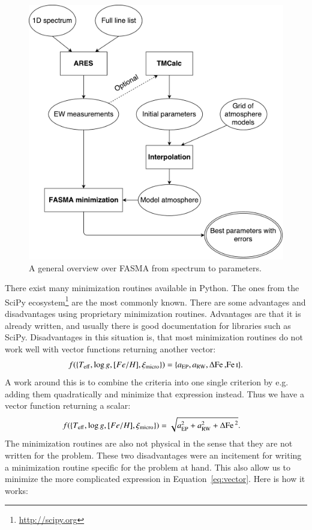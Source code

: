 \documentclass{aa}
\begin{document}
\begin{figure}[tpb]
    \centering
    \includegraphics[width=1.0\linewidth,natwidth=700,natheight=650]{figures/FASMA_general.pdf}
    \caption{A general overview over FASMA from spectrum to parameters.}
    \label{fig:FASMA_general}
\end{figure}

There exist many minimization routines available in Python. The ones from the
SciPy ecosystem\footnote{\url{http://scipy.org}} are the most commonly known.
There are some advantages and disadvantages using proprietary minimization
routines. Advantages are that it is already written, and usually there is good
documentation for libraries such as SciPy. Disadvantages in this situation is,
that most minimization routines do not work well with vector functions returning
another vector:
\begin{align}
    f(\{T_\mathrm{eff}, \log g, [Fe/H], \xi_\mathrm{micro}\}) = \{a_\mathrm{EP}, a_\mathrm{RW}, \Delta\ion{Fe}, \ion{Fe}{I}\}. \label{eq:vector}
\end{align}
A work around this is to combine the criteria into one single criterion by e.g.
adding them quadratically and minimize that expression instead. Thus we have a
vector function returning a scalar:
\begin{align}
    f(\{T_\mathrm{eff}, \log g, [Fe/H], \xi_\mathrm{micro}\}) &= \sqrt{a_\mathrm{EP}^2 + a_\mathrm{RW}^2 + \Delta\ion{Fe}{}^2}. \label{eq:scalar}
\end{align}
The minimization routines are also not physical in the sense that they are not
written for the problem. These two disadvantages were an incitement for writing
a minimization routine specific for the problem at hand. This also allow us to
minimize the more complicated expression in Equation~\ref{eq:vector}. Here is
how it works:
\end{document}
